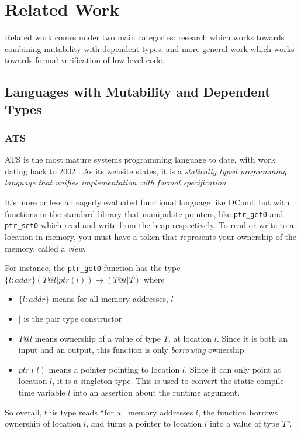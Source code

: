 \documentclass[12pt,twoside]{report}
\begin{document}
\section{Related Work}
Related work comes under two main categories: research which works towards combining mutability with dependent types, and more general work which works towards formal verification of low level code.

\subsection{Languages with Mutability and Dependent Types}

\subsubsection{ATS}
ATS \citep{xi_applied_2017} is the most mature systems programming language to date, with work dating back to 2002 \citep{ATSImplements}. As its website states, it is a \textit{statically typed programming language that unifies implementation with formal specification} \citep{ATSHome}.

It's more or less an eagerly evaluated functional language like OCaml, but with functions in the standard library that manipulate pointers, like \verb|ptr_get0| and \verb|ptr_set0| which read and write from the heap respectively. To read or write to a location in memory, you must have a token that represents your ownership of the memory, called a \textit{view}.

For instance, the \verb|ptr_get0| function has the type $\{l:addr\} (T @ l | ptr (l)) \rightarrow (T @ l | T)$ where
\begin{itemize}
  \item $\{l:addr\}$ means for all memory addresses, $l$
  \item $|$ is the pair type constructor
  \item $T @ l$ means ownership of a value of type $T$, at location $l$. Since it is both an input and an output, this function is only \textit{borrowing} ownership.
  \item $ptr(l)$ means a pointer pointing to location $l$. Since it can only point at location $l$, it is a singleton type. This is used to convert the static compile-time variable $l$ into an assertion about the runtime argument.
\end{itemize}


So overall, this type reads ``for all memory addresses $l$, the function borrows ownership of location $l$, and turns a pointer to location $l$ into a value of type $T$''.
\end{document}
